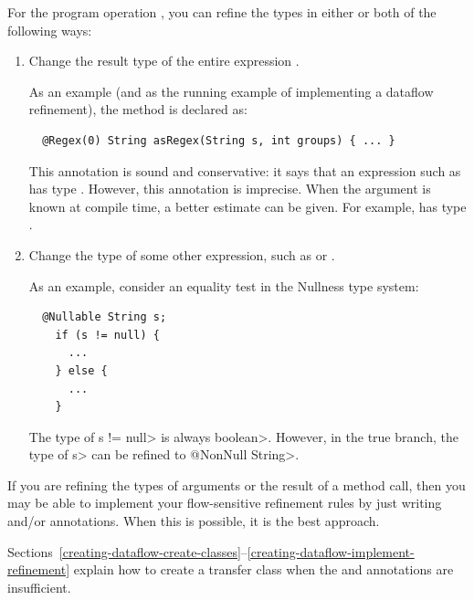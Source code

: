 For the program operation , you can refine
the types in either or both of the following ways:
\begin{enumerate}
\item Change the result type of the entire expression .

As an example (and as the running example of implementing a dataflow
refinement), the  method is declared as:

\begin{smaller}
\begin{Verbatim}
  @Regex(0) String asRegex(String s, int groups) { ... }
\end{Verbatim}
\end{smaller}

\noindent
This annotation is sound and conservative:  it says that an expression such
as  has type .  However, this annotation is imprecise.  When the 
argument is known at compile time, a better estimate can be given.  For
example,  has type .

\item Change the type of some other expression, such as  or .

As an example, consider an equality test in the Nullness type system:

\begin{Verbatim}
  @Nullable String s;
    if (s != null) {
      ...
    } else {
      ...
    }
\end{Verbatim}

The type of \<s != null> is always \<boolean>.  However, in the
true branch, the type of \<s> can be refined to \<@NonNull String>.

\end{enumerate}

If you are refining the types of arguments or the result of a method call,
then you may be able to implement your flow-sensitive refinement rules by
just writing  and/or
 annotations.
When this is possible, it is the best approach.

Sections~\ref{creating-dataflow-create-classes}--\ref{creating-dataflow-implement-refinement}
explain how to create a transfer class when the
 and
 annotations are insufficient.


